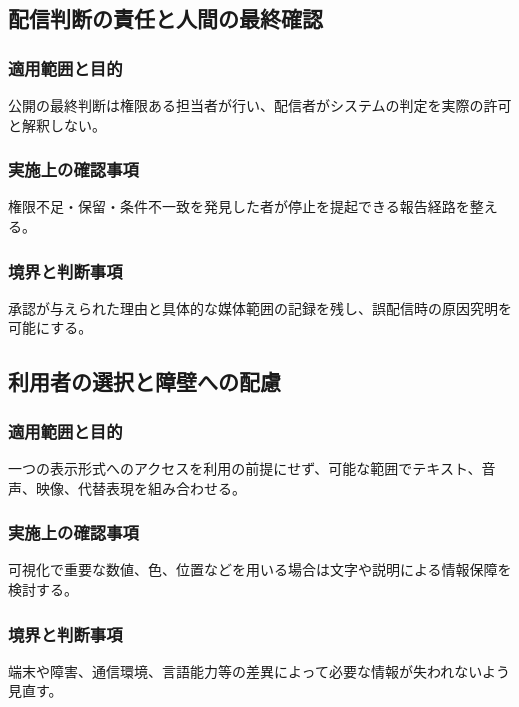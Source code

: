 \documentclass[a4paper,11pt]{article}
\begin{document}
\subsection{配信判断の責任と人間の最終確認}
\subsubsection{適用範囲と目的}
\par 公開の最終判断は権限ある担当者が行い、配信者がシステムの判定を実際の許可と解釈しない。\par\medskip
\subsubsection{実施上の確認事項}
\par 権限不足・保留・条件不一致を発見した者が停止を提起できる報告経路を整える。\par\medskip
\subsubsection{境界と判断事項}
\par 承認が与えられた理由と具体的な媒体範囲の記録を残し、誤配信時の原因究明を可能にする。\par\medskip
\subsection{利用者の選択と障壁への配慮}
\subsubsection{適用範囲と目的}
\par 一つの表示形式へのアクセスを利用の前提にせず、可能な範囲でテキスト、音声、映像、代替表現を組み合わせる。\par\medskip
\subsubsection{実施上の確認事項}
\par 可視化で重要な数値、色、位置などを用いる場合は文字や説明による情報保障を検討する。\par\medskip
\subsubsection{境界と判断事項}
\par 端末や障害、通信環境、言語能力等の差異によって必要な情報が失われないよう見直す。\par\medskip
\end{document}
